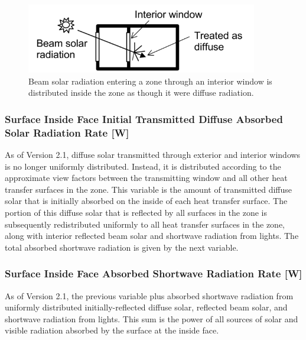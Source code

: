 \begin{figure}[hbtp] %
\centering
\includegraphics[width=0.9\textwidth, height=0.9\textheight, keepaspectratio=true]{media/image057.png}
\caption{Beam solar radiation entering a zone through an interior window is distributed inside the zone as though it were diffuse radiation. \protect \label{fig:beam-solar-radiation-entering-a-zone-through}}
\end{figure}

\subsubsection{Surface Inside Face Initial Transmitted Diffuse Absorbed Solar Radiation Rate {[}W{]}}\label{surface-inside-face-initial-transmitted-diffuse-absorbed-solar-radiation-rate-w}

As of Version 2.1, diffuse solar transmitted through exterior and interior windows is no longer uniformly distributed. Instead, it is distributed according to the approximate view factors between the transmitting window and all other heat transfer surfaces in the zone. This variable is the amount of transmitted diffuse solar that is initially absorbed on the inside of each heat transfer surface. The portion of this diffuse solar that is reflected by all surfaces in the zone is subsequently redistributed uniformly to all heat transfer surfaces in the zone, along with interior reflected beam solar and shortwave radiation from lights. The total absorbed shortwave radiation is given by the next variable.

\subsubsection{Surface Inside Face Absorbed Shortwave Radiation Rate {[}W{]}}\label{surface-inside-face-absorbed-shortwave-radiation-rate-w}

As of Version 2.1, the previous variable plus absorbed shortwave radiation from uniformly distributed initially-reflected diffuse solar, reflected beam solar, and shortwave radiation from lights. This sum is the power of all sources of solar and visible radiation absorbed by the surface at the inside face.

